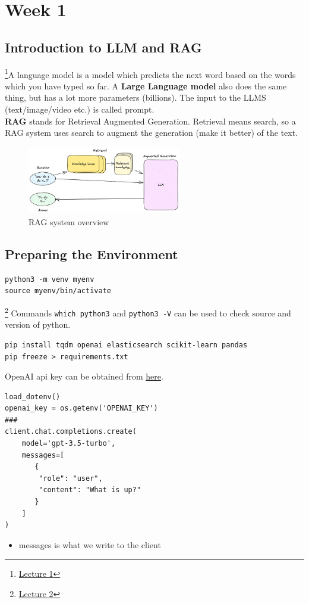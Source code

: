 \section{Week 1}

\subsection{Introduction to LLM and RAG}
\footnote{\href{https://www.youtube.com/watch?v=Q75JgLEXMsM&list=PL3MmuxUbc_hIB4fSqLy_0AfTjVLpgjV3R&index=1}{Lecture 1}}A language model is a model which predicts the next word based on the words which you have typed so far. A \textbf{Large Language model} also does the same thing,
but has a lot more parameters (billions).
The input to the LLMS (text/image/video etc.) is called prompt.\\
\textbf{RAG} stands for Retrieval Augmented Generation. Retrieval means search, so a RAG system uses search to augment the generation (make it better) of the text.

\begin{figure}[h]
    \centering
    \includegraphics[width=0.6\textwidth]{media/rag_system.png}
    \caption{RAG system overview}
    \label{fig:mesh1}
\end{figure}

\subsection{Preparing the Environment}
\begin{lstlisting}
python3 -m venv myenv
source myenv/bin/activate\end{lstlisting}
\footnote{\href{https://www.youtube.com/watch?v=ozCpmkbJNJE&list=PL3MmuxUbc_hIB4fSqLy_0AfTjVLpgjV3R&index=2}{Lecture 2}}
Commands \verb|which python3| and \verb|python3 -V| can be used to check source and version of python.
\begin{lstlisting}
pip install tqdm openai elasticsearch scikit-learn pandas
pip freeze > requirements.txt\end{lstlisting}
OpenAI api key can be obtained from \href{https://platform.openai.com/api-keys}{here}.
\begin{lstlisting}
load_dotenv()
openai_key = os.getenv('OPENAI_KEY')
###
client.chat.completions.create(
    model='gpt-3.5-turbo',
    messages=[
       {
        "role": "user",
        "content": "What is up?"
       }
    ]
)\end{lstlisting}
\begin{itemize}
    \item messages is what we write to the client
\end{itemize}
